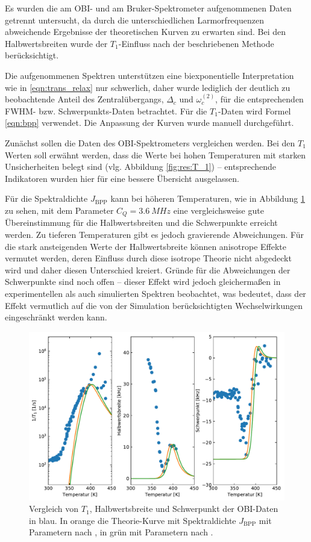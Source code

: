 Es wurden die am OBI- und am Bruker-Spektrometer aufgenommenen Daten getrennt untersucht, da durch die unterschiedlichen Larmorfrequenzen abweichende Ergebnisse der theoretischen Kurven zu erwarten sind. Bei den Halbwertsbreiten wurde der $T_1$-Einfluss nach der beschriebenen Methode berücksichtigt.



Die aufgenommenen Spektren unterstützen eine biexponentielle Interpretation wie in \eqref{eqn:trans_relax} nur schwerlich, daher wurde lediglich der deutlich zu beobachtende Anteil des Zentralübergangs, $\Delta_c$ und $\omega_c^{(2)}$, für die entsprechenden FWHM- bzw. Schwerpunkts-Daten betrachtet. Für die $T_1$-Daten wird Formel \eqref{eqn:bpp} verwendet. Die Anpassung der Kurven wurde manuell durchgeführt.



Zunächst sollen die Daten des OBI-Spektrometers vergleichen werden. Bei den $T_1$ Werten soll erwähnt werden, dass die Werte bei hohen Temperaturen mit starken Unsicherheiten belegt sind (vlg. Abbildung \ref{fig:res:T_1}) -- entsprechende Indikatoren wurden hier für eine bessere Übersicht ausgelassen.

Für die Spektraldichte $J_\text{BPP}$ kann bei höheren Temperaturen, wie in Abbildung \ref{fig:res:theorie_j} zu sehen, mit dem Parameter $C_Q = \SI{3.6}{MHz}$ eine vergleichsweise gute Übereinstimmung für die Halbwertsbreiten und die Schwerpunkte erreicht werden. Zu tieferen Temperaturen gibt es jedoch gravierende Abweichungen. Für die stark ansteigenden Werte der Halbwertsbreite können anisotrope Effekte vermutet werden, deren Einfluss durch diese isotrope Theorie nicht abgedeckt wird und daher diesen Unterschied kreiert. Gründe für die Abweichungen der Schwerpunkte sind noch offen -- dieser Effekt wird jedoch gleichermaßen in experimentellen als auch simulierten Spektren beobachtet, was bedeutet, dass der Effekt vermutlich auf die von der Simulation berücksichtigten Wechselwirkungen eingeschränkt werden kann.
\begin{figure}
	\begin{center}
		\includegraphics[width=.9\textwidth]{graphics/plot/OBI_J_02.pdf}
	\end{center}
	\caption{Vergleich von $T_1$, Halbwertsbreite und Schwerpunkt der OBI-Daten in blau. In orange die Theorie-Kurve mit Spektraldichte $J_\text{BPP}$ mit Parametern nach \cite{PIMENOV199793}, in grün mit Parametern nach \cite{crn_augsburg}.} \label{fig:res:theorie_j}
\end{figure}

